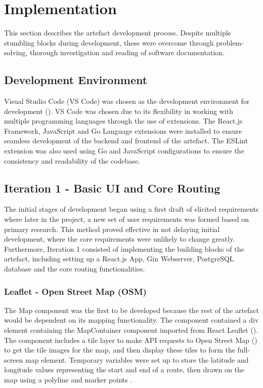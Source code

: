 \chapter{Implementation}
\label{chap:implementation}

This section describes the artefact development process. Despite multiple stumbling blocks during development, these were overcome through problem-solving, thorough investigation and reading of software documentation.  

\section{Development Environment}
\label{implementation:de}

Visual Studio Code (VS Code) was chosen as the development environment for development (\cite{noauthor_visual_nodate}). VS Code was chosen due to its flexibility in working with multiple programming languages through the use of extensions. The React.js Framework, JavaScript and Go Language extensions were installed to ensure seamless development of the backend and frontend of the artefact. The ESLint extension was also used using Go and JavaScript configurations to ensure the consistency and readability of the codebase.

\section{Iteration 1 - Basic UI and Core Routing}
\label{implementation:iteration1}
The initial stages of development began using a first draft of elicited requirements  where later in the project, a new set of user requirements was formed based on primary research. This method proved effective in not delaying initial development, where the core requirements were unlikely to change greatly. Furthermore, Iteration 1 consisted of implementing the building blocks of the artefact, including setting up a React.js App, Gin Webserver, PostgreSQL database and the core routing functionalities.

\subsection{Leaflet - Open Street Map (OSM)}
\label{iteration1:leaflet-osm}
The Map component was the first to be developed because the rest of the artefact would be dependent on its mapping functionality. The component contained a div element containing the MapContainer component imported from React Leaflet (\cite{noauthor_react_nodate}). The component includes a tile layer to make API requests to Open Street Map (\cite{noauthor_openstreetmap_nodate}) to get the tile images for the map, and then display these tiles to form the full-screen map element. Temporary variables were set up to store the latitude and longitude values representing the start and end of a route, then drawn on the map using a polyline and marker points . 


